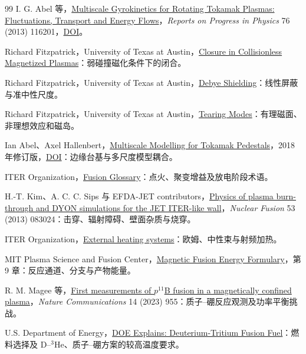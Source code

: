\documentclass[12pt,fontset=none]{ctexart}
\numberwithin{equation}{section}
\numberwithin{table}{section}
\numberwithin{figure}{section}
\begin{document}
\begin{thebibliography}{99}
I. G. Abel 等，\href{https://arxiv.org/abs/1209.4782}{Multiscale Gyrokinetics for Rotating Tokamak Plasmas: Fluctuations, Transport and Energy Flows}，\textit{Reports on Progress in Physics} 76 (2013) 116201，\href{https://doi.org/10.1088/0034-4885/76/11/116201}{DOI}。

Richard Fitzpatrick，University of Texas at Austin，\href{https://farside.ph.utexas.edu/teaching/plasma/lectures1/node61.html}{Closure in Collisionless Magnetized Plasmas}：弱碰撞磁化条件下的闭合。

Richard Fitzpatrick，University of Texas at Austin，\href{https://farside.ph.utexas.edu/teaching/plasma/lectures1/node7.html}{Debye Shielding}：线性屏蔽与准中性尺度。

Richard Fitzpatrick，University of Texas at Austin，\href{https://farside.ph.utexas.edu/teaching/plasma1/Fusionhtml/node14.html}{Tearing Modes}：有理磁面、非理想效应和磁岛。

Ian Abel、Axel Hallenbert，\href{https://arxiv.org/abs/1711.10403}{Multiscale Modelling for Tokamak Pedestals}，2018 年修订版，\href{https://doi.org/10.1017/S0022377818000326}{DOI}：边缘台基与多尺度模型耦合。

ITER Organization，\href{https://www.iter.org/fusion-glossary}{Fusion Glossary}：点火、聚变增益及放电阶段术语。

H.-T. Kim、A. C. C. Sips 与 EFDA-JET contributors，\href{https://arxiv.org/abs/1309.4890}{Physics of plasma burn-through and DYON simulations for the JET ITER-like wall}，\textit{Nuclear Fusion} 53 (2013) 083024：击穿、辐射障碍、壁面杂质与烧穿。

ITER Organization，\href{https://www.iter.org/machine/supporting-systems/external-heating-systems}{External heating systems}：欧姆、中性束与射频加热。

MIT Plasma Science and Fusion Center，\href{https://www-internal.psfc.mit.edu/research/MFEFormulary/files/MFEFormulary.pdf}{Magnetic Fusion Energy Formulary}，第 9 章：反应通道、分支与产物能量。

R. M. Magee 等，\href{https://doi.org/10.1038/s41467-023-36655-1}{First measurements of $p{}^{11}$B fusion in a magnetically confined plasma}，\textit{Nature Communications} 14 (2023) 955：质子--硼反应观测及功率平衡挑战。

U.S. Department of Energy，\href{https://www.energy.gov/science/doe-explainsdeuterium-tritium-fusion-fuel}{DOE Explains: Deuterium-Tritium Fusion Fuel}：燃料选择及 D--${}^3$He、质子--硼方案的较高温度要求。


\end{thebibliography}
\end{document}
